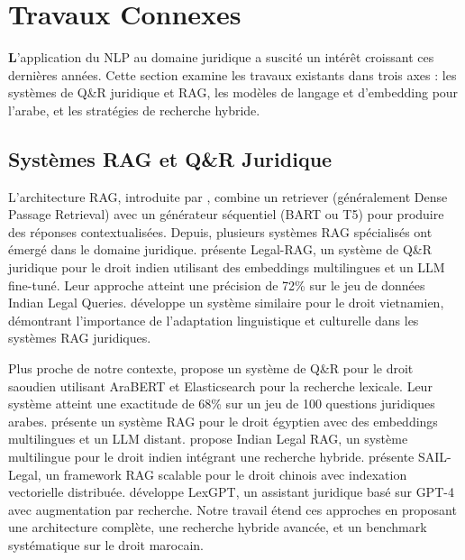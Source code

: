 \section{Travaux Connexes}

\noindent\textcolor{titleblue}{\Large\bfseries L}'application du NLP au domaine juridique
a suscité un intérêt croissant ces dernières années. Cette section examine les
travaux existants dans trois axes : les systèmes de Q\&R juridique et RAG, les
modèles de langage et d'embedding pour l'arabe, et les stratégies de recherche
hybride.

\subsection{Systèmes RAG et Q\&R Juridique}

L'architecture RAG, introduite par \cite{lewis2020retrieval}, combine un
retriever (généralement Dense Passage Retrieval) avec un générateur
séquentiel (BART ou T5) pour produire des réponses contextualisées.
Depuis, plusieurs systèmes RAG spécialisés ont émergé dans le domaine
juridique. \cite{louis2023legal} présente Legal-RAG, un système de Q\&R
juridique pour le droit indien utilisant des embeddings multilingues et un
LLM fine-tuné. Leur approche atteint une précision de 72\% sur le jeu de
données Indian Legal Queries. \cite{nguyen2023vietnamese} développe un
système similaire pour le droit vietnamien, démontrant l'importance de
l'adaptation linguistique et culturelle dans les systèmes RAG juridiques.

\vspace{0.2cm}

\noindent Plus proche de notre contexte, \cite{alshareef2023arabic} propose
un système de Q\&R pour le droit saoudien utilisant AraBERT et Elasticsearch
pour la recherche lexicale. Leur système atteint une exactitude de 68\% sur
un jeu de 100 questions juridiques arabes. \cite{elaraby2024legal} présente
un système RAG pour le droit égyptien avec des embeddings multilingues et
un LLM distant. \cite{sharma2024indian} propose Indian Legal RAG, un
système multilingue pour le droit indien intégrant une recherche hybride.
\cite{huang2024sail} présente SAIL-Legal, un framework RAG scalable pour
le droit chinois avec indexation vectorielle distribuée.
\cite{zhou2023lexgpt} développe LexGPT, un assistant juridique basé sur
GPT-4 avec augmentation par recherche. Notre travail étend ces approches
en proposant une architecture complète, une recherche hybride avancée, et
un benchmark systématique sur le droit marocain.

